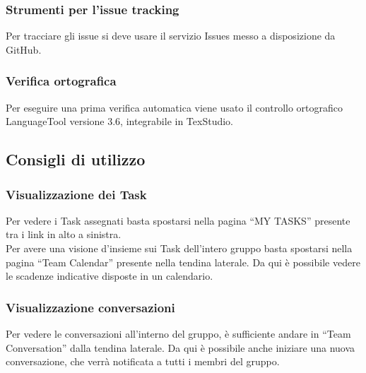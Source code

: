 \documentclass[../NormeDiProgetto.tex]{subfiles}
\begin{document}
		\subsubsection{Strumenti per l'issue tracking}
		Per tracciare gli issue si deve usare il servizio Issues messo a disposizione da GitHub.
		\subsubsection{Verifica ortografica}
		Per eseguire una prima verifica automatica viene usato il controllo ortografico LanguageTool versione 3.6, integrabile in TexStudio.
		
		
		
		
		
		
		
		\subsection{Consigli di utilizzo}
			\subsubsection{Visualizzazione dei Task}
				Per vedere i Task assegnati basta spostarsi nella pagina ``MY
				TASKS'' presente tra i link in alto a sinistra.\\
				Per avere una visione d'insieme sui Task dell'intero gruppo basta
				spostarsi nella pagina ``Team Calendar'' presente nella tendina
				laterale. Da qui è possibile vedere le scadenze indicative disposte
				in un calendario.
			\subsubsection{Visualizzazione conversazioni}
				Per vedere le conversazioni all'interno del gruppo, è sufficiente
				andare in ``Team Conversation'' dalla tendina laterale. Da qui è
				possibile anche iniziare una nuova conversazione, che verrà
				notificata a tutti i membri del gruppo.
		
\end{document}
